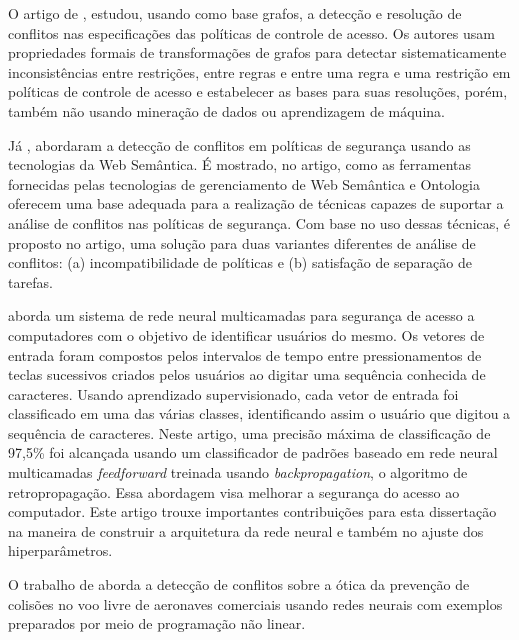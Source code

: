 O artigo de \cite{koch_conflict_2002}, estudou,  usando como base grafos, a detecção e resolução de conflitos nas especificações das políticas de controle de acesso. Os autores usam propriedades formais de transformações de grafos para detectar sistematicamente inconsistências entre restrições, entre regras e entre uma regra e uma restrição em políticas de controle de acesso e estabelecer as bases para suas resoluções,  porém, também não usando mineração de dados ou aprendizagem de máquina.

Já \cite{neri_conflict_2012}, abordaram a detecção de conflitos em políticas de segurança usando as tecnologias da Web Semântica. É mostrado, no artigo, como as ferramentas fornecidas pelas tecnologias de gerenciamento de Web Semântica e Ontologia oferecem uma base adequada para a realização de técnicas capazes de suportar a análise de conflitos nas políticas de segurança. Com base no uso dessas técnicas, é proposto no artigo, uma solução para duas variantes diferentes de análise de conflitos: (a) incompatibilidade de políticas e (b) satisfação de separação de tarefas. 

\cite{obaidat_multilayer_1994} aborda um sistema de rede neural multicamadas para segurança de acesso a computadores com o objetivo de identificar usuários do mesmo. Os vetores de entrada foram compostos pelos intervalos de tempo entre pressionamentos de teclas sucessivos criados pelos usuários ao digitar uma sequência conhecida de caracteres. Usando aprendizado supervisionado, cada vetor de entrada foi classificado em uma das várias classes, identificando assim o usuário que digitou a sequência de caracteres. Neste artigo, uma precisão máxima de classificação de 97,5\% foi alcançada usando um classificador de padrões baseado em rede neural multicamadas \textit{feedforward} treinada usando \textit{backpropagation}, o algoritmo de retropropagação. Essa abordagem visa melhorar a segurança do acesso ao computador. Este artigo trouxe importantes contribuições para esta dissertação na maneira de construir a arquitetura da rede neural e também no ajuste dos hiperparâmetros.

O trabalho de \cite{christodoulou_collision_2008} aborda a detecção de conflitos sobre a ótica da prevenção de colisões no voo livre de aeronaves comerciais usando redes neurais com exemplos preparados por meio de programação não linear. 

